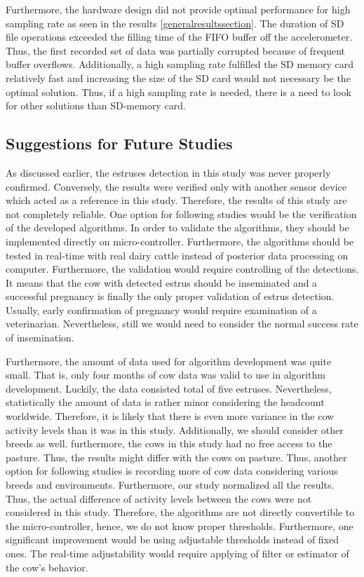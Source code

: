 \documentclass[english,12pt,a4paper,pdftex,elec,utf8]{aaltothesis}
\begin{document}
Furthermore, the hardware design did not provide optimal performance for high sampling rate as seen in the results \ref{generalresultssection}. The duration of SD file operations exceeded the filling time of the FIFO buffer off the accelerometer. Thus, the first recorded set of data was partially corrupted because of frequent buffer overflows. Additionally, a high sampling rate fulfilled the SD memory card relatively fast and increasing the size of the SD card would not necessary be the optimal solution. Thus, if a high sampling rate is needed, there is a need to look for other solutions than SD-memory card.


\subsection{Suggestions for Future Studies}


As discussed earlier, the estruses detection in this study was never properly confirmed. Conversely, the results were verified only with another sensor device which acted as a reference in this study. Therefore, the results of this study are not completely reliable. One option for following studies would be the verification of the developed algorithms. In order to validate the algorithms, they should be implemented directly on micro-controller. Furthermore, the algorithms should be tested in real-time with real dairy cattle instead of posterior data processing on computer. Furthermore, the validation would require controlling of the detections. It means that the cow with detected estrus should be inseminated and a successful pregnancy is finally the only proper validation of estrus detection. Usually, early confirmation of pregnancy would require examination of a veterinarian. Nevertheless, still we would need to consider the normal success rate of insemination.

Furthermore, the amount of data used for algorithm development was quite small. That is, only four months of cow data was valid to use in algorithm development. Luckily, the data consisted total of five estruses. Nevertheless, statistically the amount of data is rather minor considering the headcount worldwide. Therefore, it is likely that there is even more variance in the cow activity levels than it was in this study. Additionally, we should consider other breeds as well. furthermore, the cows in this study had no free access to the pasture. Thus, the results might differ with the cows on pasture. Thus, another option for following studies is recording more of cow data considering various breeds and environments. Furthermore, our study normalized all the results. Thus, the actual difference of activity levels between the cows were not considered in this study. Therefore, the algorithms are not directly convertible to the micro-controller, hence, we do not know proper thresholds. Furthermore, one significant improvement would be using adjustable thresholds instead of fixed ones. The real-time adjustability would require applying of filter or estimator of the cow's behavior.
\end{document}
